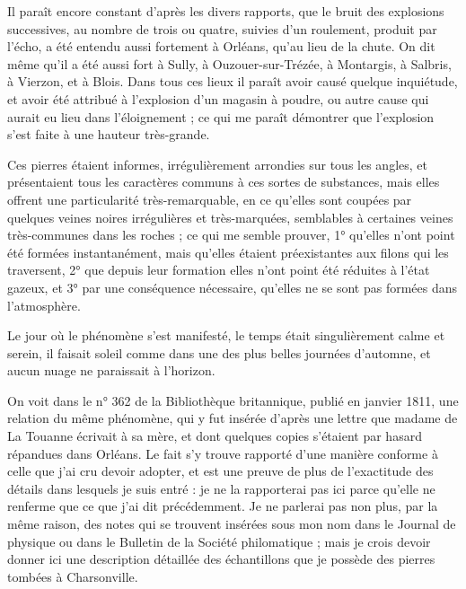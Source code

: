 \documentclass[a4paper, 12pt, oneside, french]{article}
\begin{document}
Il paraît encore constant d'après les divers rapports, que le bruit des explosions successives, au nombre de trois ou quatre, suivies d'un roulement, produit par l'écho, a été entendu aussi fortement à Orléans, qu'au lieu de la chute. On dit même qu'il a été aussi fort à Sully, à Ouzouer-sur-Trézée, à Montargis, à Salbris, à Vierzon, et à Blois. Dans tous ces lieux il paraît avoir causé quelque inquiétude, et avoir été attribué à l'explosion d'un magasin à poudre, ou autre cause qui aurait eu lieu dans l'éloignement ; ce qui me paraît démontrer que l'explosion s'est faite à une hauteur très-grande.

Ces pierres étaient informes, irrégulièrement arrondies sur tous les angles, et présentaient tous les caractères communs à ces sortes de substances, mais elles offrent une particularité très-remarquable, en ce qu'elles sont coupées par quelques veines noires irrégulières et très-marquées, semblables à certaines veines très-communes dans les roches ; ce qui me semble prouver, 1° qu'elles n'ont point été formées instantanément, mais qu'elles étaient préexistantes aux filons qui les traversent, 2° que depuis leur formation elles n'ont point été réduites à l'état gazeux, et 3° par une conséquence nécessaire, qu'elles ne se sont pas formées dans l'atmosphère.

Le jour où le phénomène s'est manifesté, le temps était singulièrement calme et serein, il faisait soleil comme dans une des plus belles journées d'automne, et aucun nuage ne paraissait à l'horizon.

On voit dans le n° 362 de la Bibliothèque britannique, publié en janvier 1811, une relation du même phénomène, qui y fut insérée d'après une lettre que madame de La Touanne écrivait à sa mère, et dont quelques copies s'étaient par hasard répandues dans Orléans. Le fait s'y trouve rapporté d'une manière conforme à celle que j'ai cru devoir adopter, et est une preuve de plus de l'exactitude des détails dans lesquels je suis entré : je ne la rapporterai pas ici parce qu'elle ne renferme que ce que j'ai dit précédemment. Je ne parlerai pas non plus, par la même raison, des notes qui se trouvent insérées sous mon nom dans le Journal de physique ou dans le Bulletin de la Société philomatique ; mais je crois devoir donner ici une description détaillée des échantillons que je possède des pierres tombées à Charsonville.
\end{document}
